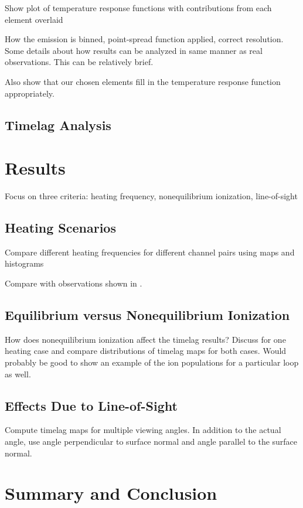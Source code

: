 \documentclass[modern,linenumbers]{aastex62}
\begin{document}
Show plot of temperature response functions with contributions from each element overlaid

How the emission is binned, point-spread function applied, correct resolution. Some details about how results can be analyzed in same manner as real observations. This can be relatively brief.

Also show that our chosen elements fill in the temperature response function appropriately.

\subsection{Timelag Analysis}
\label{timelag_analysis}


\section{Results}
\label{results}
Focus on three criteria: heating frequency, nonequilibrium ionization, line-of-sight

\subsection{Heating Scenarios}
Compare different heating frequencies for different channel pairs using maps and histograms

Compare with observations shown in \citet{viall_survey_2017}.

\subsection{Equilibrium versus Nonequilibrium Ionization}
How does nonequilibrium ionization affect the timelag results? Discuss for one heating case and compare distributions of timelag maps for both cases. Would probably be good to show an example of the ion populations for a particular loop as well.

\subsection{Effects Due to Line-of-Sight}
Compute timelag maps for multiple viewing angles. In addition to the actual angle, use angle perpendicular to surface normal and angle parallel to the surface normal.

\section{Summary and Conclusion}
\label{conclusions}

\acknowledgments





\end{document}
